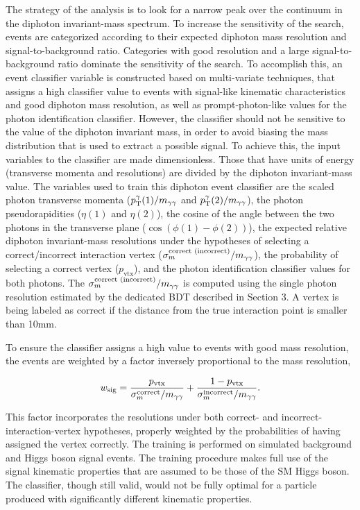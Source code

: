 \documentclass[11pt,twoside,a4paper,cmspaper,final,collab]{cms-tdr}
\begin{document}
The strategy of the analysis is to look for a narrow peak over the continuum in the diphoton invariant-mass
spectrum. To increase the sensitivity of the search, events are categorized according to their expected diphoton mass
resolution
and signal-to-background ratio. Categories with good
resolution and a large signal-to-background ratio dominate the sensitivity of the search.
To accomplish this, an event classifier variable is constructed based on multi-variate techniques, that assigns a high classifier value to events
with signal-like kinematic characteristics and good diphoton mass resolution, as well as
prompt-photon-like values for the photon identification classifier.
However, the classifier should not be sensitive to the value of the diphoton invariant mass, in order to avoid
biasing the mass distribution that is used to extract a possible signal.
To achieve this, the input variables to the classifier are made dimensionless.
Those that have units of energy (transverse momenta and resolutions) are divided by the diphoton invariant-mass value.
The variables used to train this diphoton event classifier are the scaled photon transverse momenta
($p_{\mathrm{T}}^{\gamma}(1)/m_{\gamma\gamma}$ and $p_{\mathrm{T}}^{\gamma}(2)/m_{\gamma\gamma}$), the photon pseudorapidities ($\eta(1)$ and $\eta(2)$),
the cosine of the angle between the two photons in the transverse plane ($\cos\left(\phi(1)-\phi(2)\right)$),
the expected relative diphoton invariant-mass resolutions under the hypotheses of selecting a correct/incorrect
interaction vertex ($\sigma_{m}^{\text{correct (incorrect)}}/m_{\gamma\gamma}$), the probability of selecting a correct vertex ($p_\text{vtx}$), and
the photon identification classifier values for both photons. The
$\sigma_{m}^{\text{correct (incorrect)}}/m_{\gamma\gamma}$ is computed using the
single photon resolution estimated by the dedicated BDT described in Section 3.
A vertex is being labeled as correct if the distance from the true
interaction point is smaller than 10\unit{mm}.

To ensure the classifier assigns a high  value to events with good mass resolution, the events
are weighted by a factor inversely proportional to the mass resolution,

\begin{equation}
w_\text{sig} = \frac{p_\text{vtx}}{\sigma_{m}^{\text{correct}}/m_{\gamma\gamma}} +
\frac{1-p_\text{vtx}}{\sigma_{m}^{\text{incorrect}}/m_{\gamma\gamma}}.
\end{equation}

This factor incorporates the resolutions under both correct- and incorrect-interaction-vertex
hypotheses, properly weighted by the probabilities of having assigned the vertex correctly. The training is
performed on simulated background and Higgs boson signal events. The training procedure makes full use 
of the signal kinematic properties that are assumed to be those of the SM Higgs boson.
The classifier, though still valid, would not be fully optimal for a particle produced with significantly 
different kinematic properties.
\end{document}
